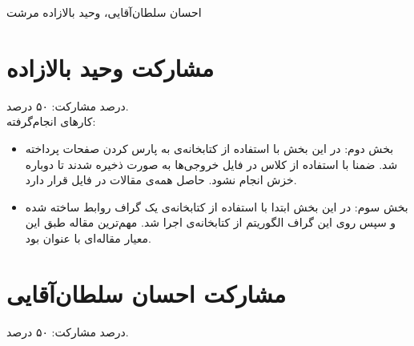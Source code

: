 \documentclass[11pt]{article}
\begin{document}
%
{احسان سلطان‌آقایی، وحید بالازاده مرشت}

\section*{مشارکت وحید بالازاده}
درصد مشارکت: ۵۰ درصد.\\

کارهای انجام‌گرفته:
\begin{itemize}
\item بخش دوم: در این بخش با استفاده از کتابخانه‌ی  به پارس کردن صفحات  پرداخته شد. ضمنا با استفاده از کلاس  در فایل  خروجی‌ها به صورت  ذخیره شدند تا دوباره خزش انجام نشود. حاصل همه‌ی مقالات در فایل  قرار دارد.
\item بخش سوم: در این بخش ابتدا با استفاده از کتابخانه‌ی  یک گراف روابط ساخته شده و سپس روی این گراف الگوریتم  از کتابخانه‌ی  اجرا شد. مهم‌ترین مقاله طبق این معیار مقاله‌ای با عنوان  بود.
\end{itemize}
\section*{مشارکت احسان سلطان‌آقایی}
درصد مشارکت: ۵۰ درصد.\\
\end{document}
